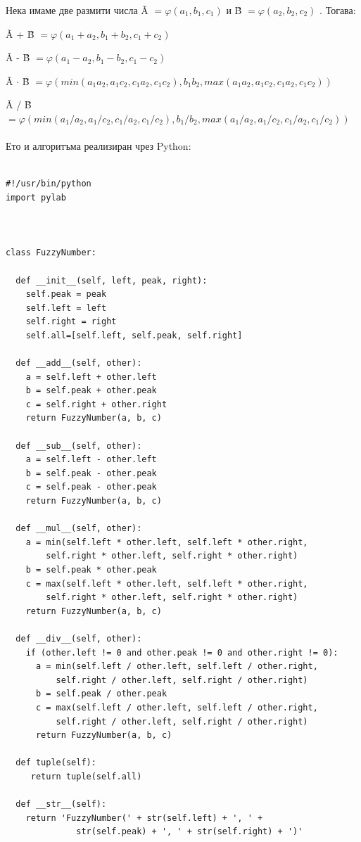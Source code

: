 \documentclass[a4paper,12pt]{article}
\begin{document}
Нека имаме две размити числа \~{A} $ = \varphi \left( a_{1} , b_{1} , c_{1} \right) $ и  \~{B} $ =  \varphi \left( a_{2} , b_{2} , c_{2} \right)$ .
\newline
Тогава:

\~{A} + \~{B} $ = \varphi \left( a_{1} + a_{2}, b_{1} + b_{2}, c_{1} + c_{2} \right)  $

\~{A} - \~{B} $ = \varphi \left( a_{1} - a_{2}, b_{1} - b_{2}, c_{1} - c_{2} \right)  $

\~{A} $ \cdot $ \~{B} $ = \varphi \left( min \left( a_{1} a_{2} , a_{1} c_{2} , c_{1} a_{2} , c_{1} c_{2} \right) , b_{1} b_{2} , max \left( a_{1} a_{2} , a_{1} c_{2} , c_{1} a_{2} , c_{1} c_{2} \right) \right)  $

\~{A} / \~{B} $ = \varphi \left( min \left( a_{1} / a_{2} , a_{1} / c_{2} , c_{1} / a_{2} , c_{1} / c_{2} \right) , b_{1} / b_{2} , max \left( a_{1} / a_{2} , a_{1} / c_{2} , c_{1} / a_{2} , c_{1} / c_{2} \right) \right)  $

\paragraph{}

Ето и алгоритъма реализиран чрез Python:

\begin{verbatim}

#!/usr/bin/python
import pylab



class FuzzyNumber:

  def __init__(self, left, peak, right):
    self.peak = peak
    self.left = left
    self.right = right
    self.all=[self.left, self.peak, self.right]

  def __add__(self, other):
    a = self.left + other.left
    b = self.peak + other.peak
    c = self.right + other.right
    return FuzzyNumber(a, b, c)

  def __sub__(self, other):
    a = self.left - other.left
    b = self.peak - other.peak
    c = self.peak - other.peak
    return FuzzyNumber(a, b, c)

  def __mul__(self, other):
    a = min(self.left * other.left, self.left * other.right, 
	    self.right * other.left, self.right * other.right)
    b = self.peak * other.peak
    c = max(self.left * other.left, self.left * other.right, 
	    self.right * other.left, self.right * other.right)
    return FuzzyNumber(a, b, c)

  def __div__(self, other):
    if (other.left != 0 and other.peak != 0 and other.right != 0):
      a = min(self.left / other.left, self.left / other.right, 
	      self.right / other.left, self.right / other.right)
      b = self.peak / other.peak
      c = max(self.left / other.left, self.left / other.right, 
	      self.right / other.left, self.right / other.right)
      return FuzzyNumber(a, b, c)

  def tuple(self):
     return tuple(self.all)

  def __str__(self):
    return 'FuzzyNumber(' + str(self.left) + ', ' + 
			  str(self.peak) + ', ' + str(self.right) + ')'

\end{verbatim}
\end{document}
